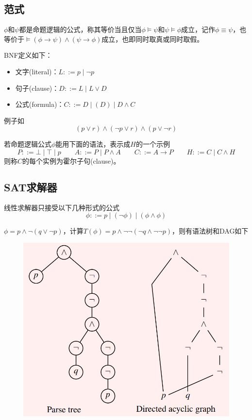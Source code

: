 \subsection{范式}
\begin{definition}
$\phi$和$\psi$都是命题逻辑的公式，称其等价当且仅当$\phi\models\psi$和$\psi\models\phi$成立，记作$\phi\equiv\psi$，也等价于$\models(\phi\to\psi)\land(\psi\to\phi)$成立，也即同时取真或同时取假。
\end{definition}
\begin{definition}
BNF定义如下：
\begin{itemize}
	\item 文字(literal)：$L::=p\mid\lnot p$
	\item 句子(clause)：$D::=L\mid L\lor D$
	\item 公式(formula)：$C::=D\mid(D)\mid D\land C$
\end{itemize}
例子如
\[(p \lor r) \land (\lnot p \lor r) \land (p \lor \lnot r)\]
\end{definition}

\begin{definition}
若命题逻辑公式$\phi$能用下面的语法，表示成$H$的一个示例
\[P::=\bot\mid\top\mid p\qquad
A::=P\mid P\land A\qquad
C::=A\to P\qquad
H::=C\mid C\land H\]
则称$C$的每个实例为霍尔子句(clause)。
\end{definition}

\subsection{SAT求解器}
线性求解器只接受以下几种形式的公式
\[\phi::=p\mid(\lnot\phi)\mid(\phi\land\phi)\]
\begin{example}
$\phi=p\land\lnot(q\lor\lnot p)$，计算$T(\phi)=p\land\lnot\lnot(\lnot q\land\lnot\lnot p)$，则有语法树和DAG如下
\begin{figure}[H]
\centering
\includegraphics[width=0.5\linewidth]{fig/parse_tree_dag_eg.jpg}
\end{figure}
\end{example}